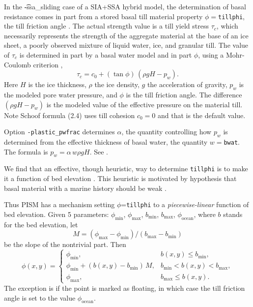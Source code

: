 In the \t{-ssa_sliding} case of a SIA+SSA hybrid model, the determination of basal resistance comes in part from a stored basal till material property $\phi=$\texttt{tillphi}, the till friction angle \cite{Paterson}.  The actual strength value is a till yield stress $\tau_c$, which necessarily represents the strength of the aggregate material at the base of an ice sheet, a poorly observed mixture of liquid water, ice, and granular till.  The value of $\tau_c$ is determined in part by a basal water model and in part $\phi$, using a Mohr-Coulomb criterion \cite[Chapter 8]{Paterson}, 
\begin{equation*}
   \tau_c = c_{0} + (\tan\phi)\,(\rho g H - p_w).
\end{equation*}
Here $H$ is the ice thickness, $\rho$ the ice density, $g$ the acceleration of gravity, $p_w$ is the modeled pore water pressure, and $\phi$ is the till friction angle.  The difference $(\rho g H - p_w)$ is the modeled value of the effective pressure on the material till.  Note Schoof \cite{SchoofStream} formula (2.4) uses till cohesion $c_0 = 0$ and that is the default value.

Option \texttt{-plastic_pwfrac} determines $\alpha$, the quantity controlling how $p_w$ is determined from the effective thickness of basal water, the quantity $w=$\texttt{bwat}.  The formula is $p_w = \alpha\, w \rho g H$.  See \cite{BKAJS}.

We find that an effective, though heuristic, way to determine \texttt{tillphi} is to make it a function of bed elevation \cite{BKAJS}.  This heuristic is motivated by hypothesis that basal material with a marine history should be weak \cite{HuybrechtsdeWolde}.

Thus PISM has a mechanism setting $\phi$=\texttt{tillphi} to a \emph{piecewise-linear} function of bed elevation.  Given 5 parameters: $\phi_{\mathrm{min}}$, $\phi_{\mathrm{max}}$, $b_{\mathrm{min}}$, $b_{\mathrm{max}}$, $\phi_{\mathrm{ocean}}$, where $b$ stands for the bed elevation, let 
\begin{equation}
  M = (\phi_{\text{max}} - \phi_{\text{min}}) / (b_{\text{max}} - b_{\text{min}})\label{eq:1}
\end{equation}
be the slope of the nontrivial part.  Then
\begin{equation}
  \phi(x,y) = \begin{cases}
    \phi_{\text{min}}, & b(x,y) \le b_{\text{min}}, \\
    \phi_{\text{min}} + (b(x,y) - b_{\text{min}}) \,M,
    &  b_{\text{min}} < b(x,y) < b_{\text{max}}, \\
    \phi_{\text{max}}, & b_{\text{max}} \le b(x,y). \end{cases}\label{eq:2}
\end{equation}
The exception is if the point is marked as floating, in which case the till friction angle
is set to the value $\phi_{\mathrm{ocean}}$.

